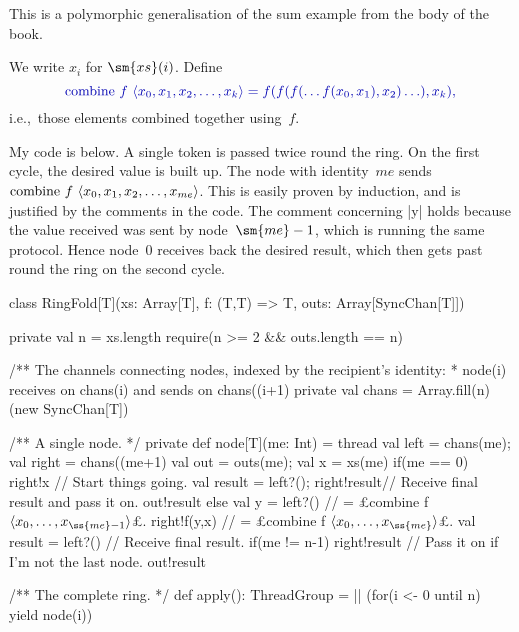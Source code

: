 \begin{answerI}
This is a polymorphic generalisation of the sum example from the body of the
book. 

We write $x_i$ for $\sm{xs}(i)$.  Define
\[\mstyle
\mathrm{combine}~f~ \seq{x_0, x_1, x_2, \ldots, x_k} = 
  f(f(f(\ldots f(x_0, x_1), x_2) \ldots ), x_k),
\]
i.e.,~those elements combined together using~$f$.  

My code is below.  A single token is passed twice round the ring.  On the
first cycle, the desired value is built up.  The node with identity~$me$ sends
$\mathrm{combine}~f~{\langle x_0, x_1, x_2, \ldots, x_{me}\rangle}$.  This is easily
proven by induction, and is justified by the comments in the code.  The
comment concerning |y| holds because the value received was sent by
node~$\sm{me}-1$, which is running the same protocol.  Hence
node~0 receives back the desired result, which then gets past round the ring
on the second cycle.
%
\begin{scala}
class RingFold[T](xs: Array[T], f: (T,T) => T, outs: Array[SyncChan[T]]){
  private val n = xs.length
  require(n >= 2 && outs.length == n)

  /** The channels connecting nodes, indexed by the recipient's identity:
    * node(i) receives on chans(i) and sends on chans((i+1)%
  private val chans = Array.fill(n)(new SyncChan[T]) 

  /** A single node. */
  private def node[T](me: Int) = thread{
    val left = chans(me); val right = chans((me+1)%
    val out = outs(me); val x = xs(me)
    if(me == 0){
      right!x // Start things going.
      val result = left?(); right!result// Receive final result and pass it on.
      out!result
    }
    else{
      val y = left?() // = £combine f $\seq{x_0, \ldots, x_{\ss{me}-1}}$£.
      right!f(y,x) // = £combine f $\seq{x_0, \ldots, x_{\ss{me}}}$£.
      val result = left?()          // Receive final result.
      if(me != n-1) right!result    // Pass it on if I'm not the last node.
      out!result
    }
  }  

  /** The complete ring. */
  def apply(): ThreadGroup = || (for(i <- 0 until n) yield node(i))
}
\end{scala}





\end{answerI}
